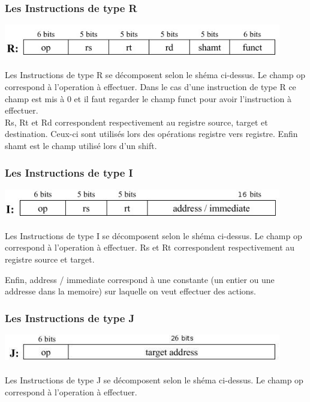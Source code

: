 \subsubsection{Les Instructions de type R}

\includegraphics[width = 12.11cm]{R-type.jpg}
~ \\ ~ \\
Les Instructions de type R se décomposent selon le shéma ci-dessus.  Le champ op
correspond à l'operation à effectuer. Dans le cas d'une instruction de type R ce
champ est mis à 0 et il faut regarder le champ funct pour avoir l'instruction à
effectuer.\\

Rs, Rt et Rd correspondent respectivement au registre source, target et
destination. Ceux-ci sont utilisés lors des opérations registre vers registre.
Enfin shamt est le champ utilisé lors d'un shift.

\subsubsection{Les Instructions de type I}

\includegraphics[width = 12.11cm]{I-type.jpg}
~ \\ ~ \\
Les Instructions de type I se décomposent selon le shéma ci-dessus. Le champ op
correspond à l'operation à effectuer. Rs et Rt correspondent respectivement au
registre source et target.

Enfin, address / immediate correspond à une constante (un entier ou une addresse
dans la memoire) sur laquelle on veut effectuer des actions.

\subsubsection{Les Instructions de type J}

\includegraphics[width = 12.11cm]{J-type.jpg}
~ \\ ~ \\
Les Instructions de type J se décomposent selon le shéma ci-dessus. Le champ op
correspond à l'operation à effectuer.

